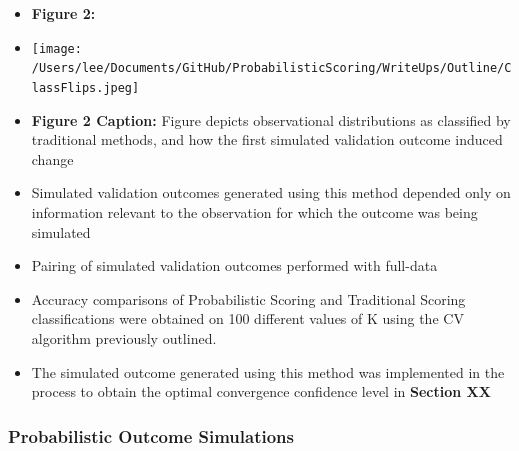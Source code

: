 \documentclass[12pt,]{article}
\providecommand{\tightlist}{%
  \setlength{\itemsep}{0pt}\setlength{\parskip}{0pt}}
\begin{document}
\begin{itemize}
\tightlist
\item
  \textbf{Figure 2:}
\item
  \texttt{[image: /Users/lee/Documents/GitHub/ProbabilisticScoring/WriteUps/Outline/ClassFlips.jpeg]}
\item
  \textbf{Figure 2 Caption:} Figure depicts observational distributions
  as classified by traditional methods, and how the first simulated
  validation outcome induced change
\item
  Simulated validation outcomes generated using this method depended
  only on information relevant to the observation for which the outcome
  was being simulated
\item
  Pairing of simulated validation outcomes performed with full-data
\item
  Accuracy comparisons of Probabilistic Scoring and Traditional Scoring
  classifications were obtained on 100 different values of K using the
  CV algorithm previously outlined.
\item
  The simulated outcome generated using this method was implemented in
  the process to obtain the optimal convergence confidence level in
  \textbf{Section XX}
\end{itemize}

\hypertarget{probabilistic-outcome-simulations}{%
\subsubsection{Probabilistic Outcome
Simulations}\label{probabilistic-outcome-simulations}}
\end{document}
